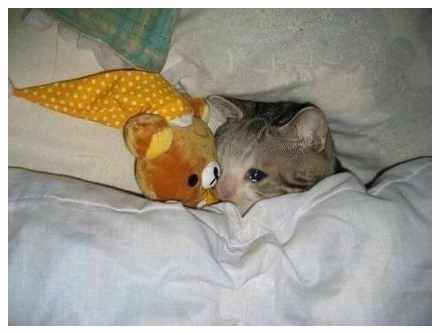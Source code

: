 \documentclass[11pt,letterpaper]{article}
\begin{document}
\begin{figure}[H]
    \centering
    \includegraphics[scale=0.4]{gato.jpeg}
\end{figure}




\end{document}
